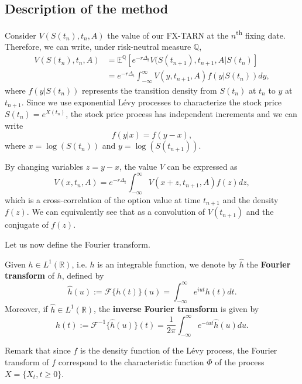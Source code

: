 \subsection{Description of the method}
Consider $V(S(t_n),t_n,A)$ the value of our FX-TARN at the $n$\textsuperscript{th} fixing date. Therefore, we can write, under risk-neutral measure $\mathbb{Q}$,
\begin{align*}
V(S(t_n),t_n,A) &= \mathbb{E}^\mathbb{Q}\left[e^{-r\Delta_t}V(S(t_{n+1}),t_{n+1},A|S(t_n)\right]\\
&=e^{-r\Delta_t}\int_{-\infty}^\infty V(y,t_{n+1},A)f(y|S(t_n))dy,
\end{align*}
where $f(y|S(t_n))$ represents the transition density from $S(t_n)$ at $t_n$ to $y$ at $t_{n+1}$. Since we use exponential L\'evy processes to characterize the stock price $S(t_n) = e^{X(t_n)}$, the stock price process has independent increments and we can write
$$f(y|x) = f(y-x),$$
where $x = \log(S(t_n))$ and $y = \log(S(t_{n+1}))$.

By changing variables $z = y-x$, the value $V$ can be expressed as
\begin{equation}\label{conv}
V(x,t_n,A) = e^{-r\Delta_t}\int_{-\infty}^\infty V(x+z,t_{n+1},A)f(z)dz,
\end{equation}
which is a cross-correlation of the option value at time $t_{n+1}$ and the density $f(z)$. We can equivalently see that as a convolution of $V(t_{n+1})$ and the conjugate of $f(z)$.

Let us now define the Fourier transform.

\begin{defn}\label{def:conv:FT}
Given $h\in L^1(\mathbb{R})$, i.e. $h$ is an integrable function, we denote by $\hat{h}$ the \textbf{Fourier transform} of $h$, defined by
$$\hat{h}(u) := \mathcal{F}\{h(t)\}(u) = \int_{-\infty}^\infty e^{iut} h(t) dt.$$
Moreover, if $\hat{h}\in L^1(\mathbb{R})$, the \textbf{inverse Fourier transform} is given by
$$h(t):=\mathcal{F}^{-1}\{\hat{h}(u)\}(t) = \frac{1}{2\pi}\int_{-\infty}^\infty e^{-iut}\hat{h}(u)du.$$
\end{defn}
Remark that since $f$ is the density function of the L\'evy process, the Fourier transform of $f$ correspond to the characteristic function $\Phi$ of the process $X = \{X_t,t\geq 0\}$.

